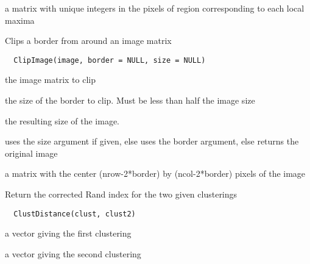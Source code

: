 \documentclass[a4paper]{book}
\begin{document}
%
\begin{Value}
a matrix with unique integers in the pixels of region
corresponding to each local maxima
\end{Value}
%
\begin{Description}\relax
Clips a border from around an image matrix
\end{Description}
%
\begin{Usage}
\begin{verbatim}
  ClipImage(image, border = NULL, size = NULL)
\end{verbatim}
\end{Usage}
%
\begin{Arguments}
\begin{ldescription}
\item[\code{image}] the image matrix to clip

\item[\code{border}] the size of the border to clip.  Must be
less than half the image size

\item[\code{size}] the resulting size of the image.
\end{ldescription}
\end{Arguments}
%
\begin{Details}\relax
uses the size argument if given, else uses the border
argument, else returns the original image
\end{Details}
%
\begin{Value}
a matrix with the center (nrow-2*border) by
(ncol-2*border) pixels of the image
\end{Value}
%
\begin{Description}\relax
Return the corrected Rand index for the two given
clusterings
\end{Description}
%
\begin{Usage}
\begin{verbatim}
  ClustDistance(clust, clust2)
\end{verbatim}
\end{Usage}
%
\begin{Arguments}
\begin{ldescription}
\item[\code{clust}] a vector giving the first clustering

\item[\code{clust2}] a vector giving the second clustering
\end{ldescription}
\end{Arguments}
\end{document}
